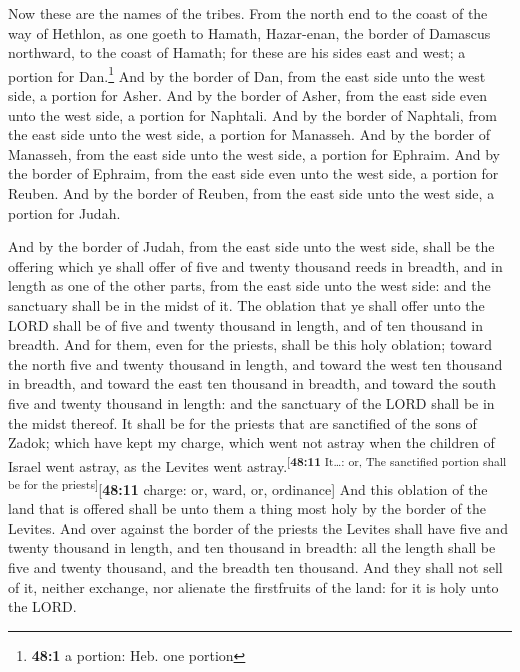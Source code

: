  Now these are the names of the tribes. From the north end
to the coast of the way of Hethlon, as one goeth to Hamath, Hazar-enan,
the border of Damascus northward, to the coast of Hamath; for these are
his sides east and west; a portion for Dan.\footnote{\textbf{48:1} a
  portion: Heb. one portion}  And by the border of Dan,
from the east side unto the west side, a portion for Asher.
 And by the border of Asher, from the east side even unto
the west side, a portion for Naphtali.  And by the border
of Naphtali, from the east side unto the west side, a portion for
Manasseh.  And by the border of Manasseh, from the east
side unto the west side, a portion for Ephraim.  And by
the border of Ephraim, from the east side even unto the west side, a
portion for Reuben.  And by the border of Reuben, from the
east side unto the west side, a portion for Judah.

 And by the border of Judah, from the east side unto the
west side, shall be the offering which ye shall offer of five and twenty
thousand reeds in breadth, and in length as one of the other parts, from
the east side unto the west side: and the sanctuary shall be in the
midst of it.  The oblation that ye shall offer unto the
LORD shall be of five and twenty thousand in length, and of ten thousand
in breadth.  And for them, even for the priests, shall be
this holy oblation; toward the north five and twenty thousand in length,
and toward the west ten thousand in breadth, and toward the east ten
thousand in breadth, and toward the south five and twenty thousand in
length: and the sanctuary of the LORD shall be in the midst thereof.
 It shall be for the priests that are sanctified of the
sons of Zadok; which have kept my charge, which went not astray when the
children of Israel went astray, as the Levites went
astray.\textsuperscript{{[}\textbf{48:11} It\ldots: or, The sanctified
portion shall be for the priests{]}}{[}\textbf{48:11} charge: or, ward,
or, ordinance{]}  And this oblation of the land that is
offered shall be unto them a thing most holy by the border of the
Levites.  And over against the border of the priests the
Levites shall have five and twenty thousand in length, and ten thousand
in breadth: all the length shall be five and twenty thousand, and the
breadth ten thousand.  And they shall not sell of it,
neither exchange, nor alienate the firstfruits of the land: for it is
holy unto the LORD.

